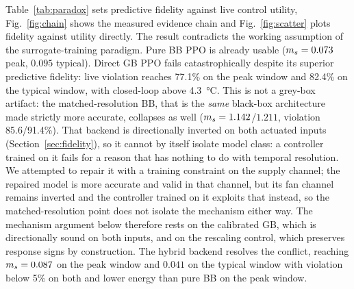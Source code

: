 Table~\ref{tab:paradox} sets predictive fidelity against live control utility, Fig.~\ref{fig:chain}
shows the measured evidence chain and Fig.~\ref{fig:scatter} plots fidelity against utility
directly. The result contradicts the working assumption of the surrogate-training paradigm. Pure BB
PPO is already usable ($m_s=0.073$ peak, $0.095$ typical). Direct GB PPO fails catastrophically
despite its superior predictive fidelity: live violation reaches 77.1\% on the peak window and
82.4\% on the typical window, with closed-loop \RMSE{} above \SI{4.3}{\celsius}. This is not a
grey-box artifact: the matched-resolution BB, that is the \emph{same} black-box architecture made
strictly more accurate, collapses as well ($m_s=1.142$/$1.211$, violation 85.6/91.4\%). That backend
is directionally inverted on both actuated inputs (Section~\ref{sec:fidelity}), so it cannot by
itself isolate model class: a controller trained on it fails for a reason that has nothing to do
with temporal resolution. We attempted to repair it with a training constraint on the supply
channel; the repaired model is more accurate and valid in that channel, but its fan channel remains
inverted and the controller trained on it exploits that instead, so the matched-resolution point
does not isolate the mechanism either way. The mechanism argument below therefore rests on the
calibrated GB, which is directionally sound on both inputs, and on the rescaling control, which
preserves response signs by construction. The hybrid
backend resolves the conflict, reaching $m_s=0.087$ on the peak window and $0.041$ on the typical
window with violation below 5\% on both and lower energy than pure BB on the peak window.

